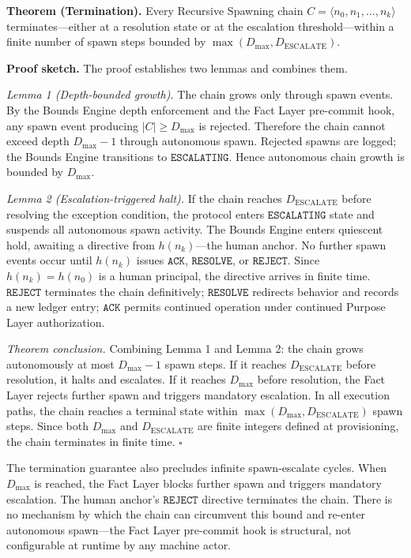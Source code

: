 \medskip
\noindent\textbf{Theorem (Termination).} Every Recursive Spawning chain $C = \langle n_0, n_1, \ldots, n_k \rangle$ terminates---either at a resolution state or at the escalation threshold---within a finite number of spawn steps bounded by $\max(D_{\mathrm{max}}, D_{\mathrm{ESCALATE}})$.

\medskip
\noindent\textbf{Proof sketch.} The proof establishes two lemmas and combines them.

\medskip
\textit{Lemma 1 (Depth-bounded growth).} The chain grows only through spawn events. By the Bounds Engine depth enforcement and the Fact Layer pre-commit hook, any spawn event producing $|C| \geq D_{\mathrm{max}}$ is rejected. Therefore the chain cannot exceed depth $D_{\mathrm{max}} - 1$ through autonomous spawn. Rejected spawns are logged; the Bounds Engine transitions to $\texttt{ESCALATING}$. Hence autonomous chain growth is bounded by $D_{\mathrm{max}}$.

\medskip
\textit{Lemma 2 (Escalation-triggered halt).} If the chain reaches $D_{\mathrm{ESCALATE}}$ before resolving the exception condition, the protocol enters $\texttt{ESCALATING}$ state and suspends all autonomous spawn activity. The Bounds Engine enters quiescent hold, awaiting a directive from $h(n_k)$---the human anchor. No further spawn events occur until $h(n_k)$ issues $\texttt{ACK}$, $\texttt{RESOLVE}$, or $\texttt{REJECT}$. Since $h(n_k) = h(n_0)$ is a human principal, the directive arrives in finite time. $\texttt{REJECT}$ terminates the chain definitively; $\texttt{RESOLVE}$ redirects behavior and records a new ledger entry; $\texttt{ACK}$ permits continued operation under continued Purpose Layer authorization.

\medskip
\textit{Theorem conclusion.} Combining Lemma 1 and Lemma 2: the chain grows autonomously at most $D_{\mathrm{max}} - 1$ spawn steps. If it reaches $D_{\mathrm{ESCALATE}}$ before resolution, it halts and escalates. If it reaches $D_{\mathrm{max}}$ before resolution, the Fact Layer rejects further spawn and triggers mandatory escalation. In all execution paths, the chain reaches a terminal state within $\max(D_{\mathrm{max}}, D_{\mathrm{ESCALATE}})$ spawn steps. Since both $D_{\mathrm{max}}$ and $D_{\mathrm{ESCALATE}}$ are finite integers defined at provisioning, the chain terminates in finite time. $\square$

The termination guarantee also precludes infinite spawn-escalate cycles. When $D_{\mathrm{max}}$ is reached, the Fact Layer blocks further spawn and triggers mandatory escalation. The human anchor's $\texttt{REJECT}$ directive terminates the chain. There is no mechanism by which the chain can circumvent this bound and re-enter autonomous spawn---the Fact Layer pre-commit hook is structural, not configurable at runtime by any machine actor.

